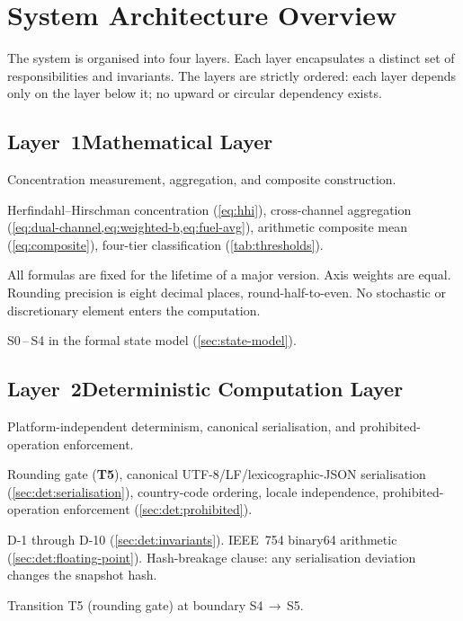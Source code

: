 \section{System Architecture Overview}\label{sec:architecture-overview}

The \ISI system is organised into four layers.  Each layer encapsulates a
distinct set of responsibilities and invariants.  The layers are strictly
ordered: each layer depends only on the layer below it; no upward or
circular dependency exists.

\subsection*{Layer~1\enspace Mathematical Layer}

\begin{description}[style=sameline, leftmargin=1em]
  \item[Scope.]  Concentration measurement, aggregation, and composite
    construction.
  \item[Core operations.]  Herfindahl--Hirschman concentration
    (\cref{eq:hhi}), cross-channel aggregation
    (\cref{eq:dual-channel,eq:weighted-b,eq:fuel-avg}), arithmetic
    composite mean (\cref{eq:composite}), four-tier classification
    (\cref{tab:thresholds}).
  \item[Invariants.]  All formulas are fixed for the lifetime of a major
    version.  Axis weights are equal.  Rounding precision is eight decimal
    places, round-half-to-even.  No stochastic or discretionary element
    enters the computation.
  \item[State coverage.]  S0\,--\,S4 in the formal state model
    (\cref{sec:state-model}).
\end{description}

\subsection*{Layer~2\enspace Deterministic Computation Layer}

\begin{description}[style=sameline, leftmargin=1em]
  \item[Scope.]  Platform-independent determinism, canonical serialisation,
    and prohibited-operation enforcement.
  \item[Core operations.]  Rounding gate (\textbf{T5}), canonical
    UTF-8/LF/lexicographic-JSON serialisation
    (\cref{sec:det:serialisation}), country-code ordering, locale
    independence, prohibited-operation enforcement
    (\cref{sec:det:prohibited}).
  \item[Invariants.]  D-1 through D-10
    (\cref{sec:det:invariants}).  IEEE~754 binary64 arithmetic
    (\cref{sec:det:floating-point}).  Hash-breakage clause: any
    serialisation deviation changes the snapshot hash.
  \item[State coverage.]  Transition T5 (rounding gate) at boundary
    S4\,\(\to\)\,S5.
\end{description}

